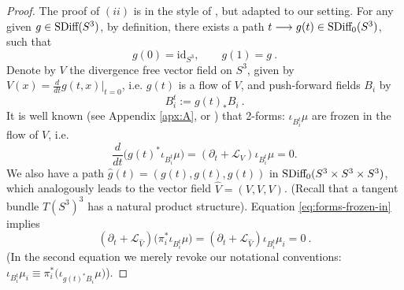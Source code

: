 \documentclass[12pt]{article}
\numberwithin{equation}{section}
\newcommand{\no}{\noindent}
\begin{document}
\begin{proof}
\no The proof of $(ii)$ is in the style of 
\cite{Berger90, Mayer03}, but adapted to our setting. For any given $g\in \text{\rm SDiff}(S^3)$, by definition, there exists a path $t\longrightarrow g(t)\in \text{\rm SDiff}_0(S^3)$,
such that
\[
 g(0)=\text{id}_{S^3},\qquad g(1)=g\ .
\]
 Denote by $V$ the divergence free vector field on $S^3$, given by $V(x)=\frac{d}{dt} g(t,x)|_{t=0}$, i.e. $g(t)$ is a flow of $V$, and push-forward fields $B_i$ by 
\[
 B^t_i:=g(t)_\ast B_i\ .
\]
It is well known (see Appendix \ref{apx:A}, or \cite[p. 224]{Freedman91-2})
 that 2-forms: $\iota_{B^t_i}\mu$ are frozen in the flow of $V$, i.e.
\begin{equation}\label{eq:forms-frozen-in}
 \frac{d}{dt}\bigl(g(t)^\ast\iota_{B^t_i}\mu\bigr) =(\partial_t+\mathcal{L}_V) \iota_{B^t_i}\mu = 0.
\end{equation} 
We also have a path $\hat{g}(t)=(g(t),g(t),g(t))$ in $\text{\rm SDiff}_0(S^3\times S^3\times S^3)$, which analogously leads to the vector field $\hat{V}=(V,V,V)$. (Recall that a tangent bundle $T(S^3)^3$ has a natural product structure). Equation \eqref{eq:forms-frozen-in} implies
\begin{equation}\label{eq:forms-frozen-in2}
(\partial_t+\mathcal{L}_{\hat{V}}) \bigl(\pi^\ast_i\iota_{B^t_i}\mu\bigr)=(\partial_t+\mathcal{L}_{\hat{V}}) \iota_{B^t_i}\mu_i= 0\ .
\end{equation} 
(In the second equation we merely revoke our notational conventions: $\iota_{B^t_i}\mu_i\equiv\pi^\ast_i\bigl(\iota_{g(t)^\ast B_i}\mu\bigr)$).


\end{proof}
\end{document}
